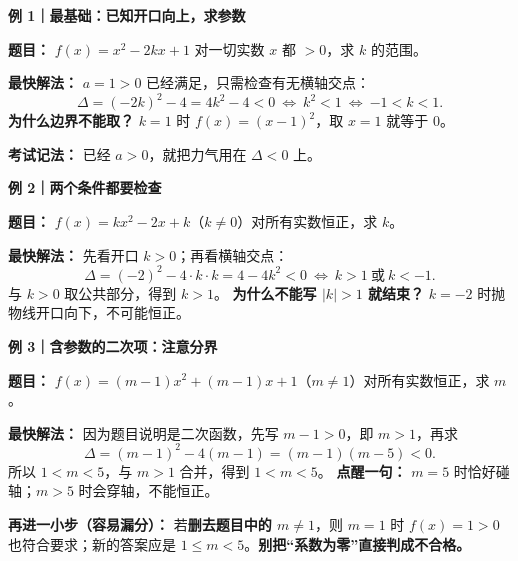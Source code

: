 \begin{examplebox}
  \textbf{\textcolor{CExample}{例 1｜最基础：已知开口向上，求参数}}

  \textbf{题目：} $f(x)=x^2-2kx+1$ 对一切实数 $x$ 都 $>0$，求 $k$ 的范围。

  \textbf{最快解法：} $a=1>0$ 已经满足，只需检查有无横轴交点：
  \[
    \Delta=(-2k)^2-4=4k^2-4<0
    \ \Longleftrightarrow\ k^2<1
    \ \Longleftrightarrow\ \boxed{-1<k<1}.
  \]
  \textbf{为什么边界不能取？} $k=1$ 时 $f(x)=(x-1)^2$，取 $x=1$ 就等于 $0$。
  \begin{center}
  
  \end{center}
  \textbf{考试记法：} 已经 $a>0$，就把力气用在 $\Delta<0$ 上。

  \medskip
  \textbf{\textcolor{CExample}{例 2｜两个条件都要检查}}

  \textbf{题目：} $f(x)=kx^2-2x+k$（$k\ne0$）对所有实数恒正，求 $k$。

  \textbf{最快解法：} 先看开口 $k>0$；再看横轴交点：
  \[
    \Delta=(-2)^2-4\cdot k\cdot k=4-4k^2<0
    \ \Longleftrightarrow\ k>1\ \text{或}\ k<-1.
  \]
  与 $k>0$ 取公共部分，得到 $\boxed{k>1}$。
  \textbf{为什么不能写 $|k|>1$ 就结束？} $k=-2$ 时抛物线开口向下，不可能恒正。
  \begin{center}
  
  \end{center}

  \medskip
  \textbf{\textcolor{CExample}{例 3｜含参数的二次项：注意分界}}

  \textbf{题目：} $f(x)=(m-1)x^2+(m-1)x+1$（$m\ne1$）对所有实数恒正，求 $m$。

  \textbf{最快解法：} 因为题目说明是二次函数，先写 $m-1>0$，即 $m>1$，再求
  \[
    \Delta=(m-1)^2-4(m-1)=(m-1)(m-5)<0.
  \]
  所以 $1<m<5$，与 $m>1$ 合并，得到 $\boxed{1<m<5}$。
  \textbf{点醒一句：} $m=5$ 时恰好碰轴；$m>5$ 时会穿轴，不能恒正。
  \begin{center}
  
  \end{center}
  \textbf{再进一小步（容易漏分）：} 若\textbf{删去题目中的 $m\ne1$}，则 $m=1$ 时 $f(x)=1>0$ 也符合要求；新的答案应是 $\boxed{1\le m<5}$。\textbf{别把“系数为零”直接判成不合格。}
\end{examplebox}
